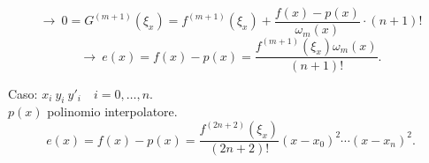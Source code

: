 \begin{dimo}
\[
\longrightarrow \ 0 = G^{(m+1)}(\xi_x) = f^{(m+1)}(\xi_x) +
\frac{f(x)-p(x)}{\omega_m(x)}\cdot(n+1)!
\]
\[
\longrightarrow \ e(x) = f(x) - p(x) =
\frac{f^{(m+1)}(\xi_x)\omega_m(x)}{(n+1)!}.
\]

Caso: $x_i\ y_i\ y'_i \quad i = 0,\ldots,n$.\\
$p(x)$ polinomio interpolatore.
\[e(x) = f(x) -p(x) = \frac{f^{(2n +2)}(\xi_x)}{(2n+2)!}(x-x_0)^2\cdots
(x-x_n)^2.\]
\end{dimo}

